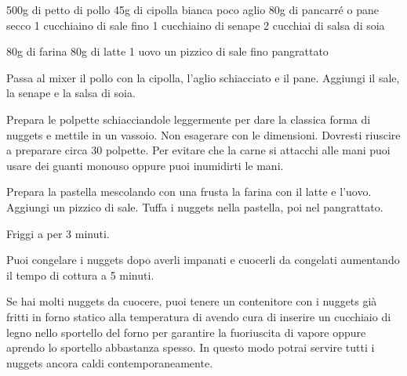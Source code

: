 \begin{ingreds}
	500g di petto di pollo
	45g di cipolla bianca
	poco aglio
	80g di pancarré o pane secco
	1 cucchiaino di sale fino
	1 cucchiaino di senape
	2 cucchiai di salsa di soia

\columnbreak
{}
	80g di farina
	80g di latte
	1 uovo
	un pizzico di sale fino
	pangrattato
\end{ingreds}

\begin{method}
Passa al mixer il pollo con la cipolla, l'aglio schiacciato e il pane. Aggiungi il sale, la senape e la salsa di soia.

Prepara le polpette schiacciandole leggermente per dare la classica forma di nuggets e mettile in un vassoio. Non esagerare con le dimensioni. Dovresti riuscire a preparare circa 30 polpette. Per evitare che la carne si attacchi alle mani puoi usare dei guanti monouso oppure puoi inumidirti le mani.

Prepara la pastella mescolando con una frusta la farina con il latte e l'uovo. Aggiungi un pizzico di sale. Tuffa i nuggets nella pastella, poi nel pangrattato.

Friggi a  per 3 minuti.

\end {method}

	\begin{note}
		Puoi congelare i nuggets dopo averli impanati e cuocerli da congelati aumentando il tempo di cottura a 5 minuti.

		Se hai molti nuggets da cuocere, puoi tenere un contenitore con i nuggets già fritti in forno statico alla temperatura di  avendo cura di inserire un cucchiaio di legno nello sportello del forno per garantire la fuoriuscita di vapore oppure aprendo lo sportello abbastanza spesso. In questo modo potrai servire tutti i nuggets ancora caldi contemporaneamente.
	\end{note}



